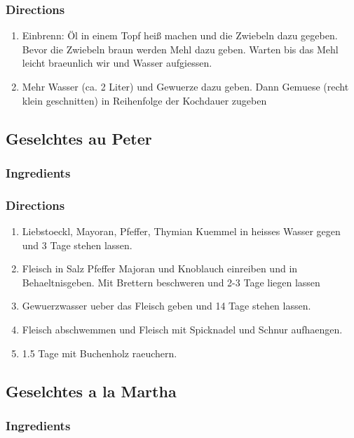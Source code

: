 \subsubsection*{Directions}
\begin{enumerate}
\item Einbrenn: Öl in einem Topf heiß machen und die Zwiebeln dazu gegeben. Bevor die Zwiebeln 
braun werden Mehl dazu geben. Warten bis das Mehl leicht braeunlich wir und Wasser aufgiessen.
\item Mehr Wasser (ca. 2 Liter) und Gewuerze dazu geben. Dann Gemuese (recht klein geschnitten) in Reihenfolge der Kochdauer zugeben
\end{enumerate}
\pagebreak


\subsection{Geselchtes au Peter}
\subsubsection*{Ingredients}
\subsubsection*{Directions}
\begin{enumerate}
\item Liebstoeckl, Mayoran, Pfeffer, Thymian Kuemmel in heisses Wasser gegen und 3 Tage stehen lassen.
\item Fleisch in Salz Pfeffer Majoran und Knoblauch einreiben und in Behaeltnisgeben. Mit Brettern beschweren und 2-3 Tage liegen lassen
\item Gewuerzwasser ueber das Fleisch geben und 14 Tage stehen lassen.
\item Fleisch abschwemmen und Fleisch mit Spicknadel und Schnur aufhaengen.
\item 1.5 Tage mit Buchenholz raeuchern.
\end{enumerate}
\pagebreak


\subsection{Geselchtes a la Martha}
\subsubsection*{Ingredients}
